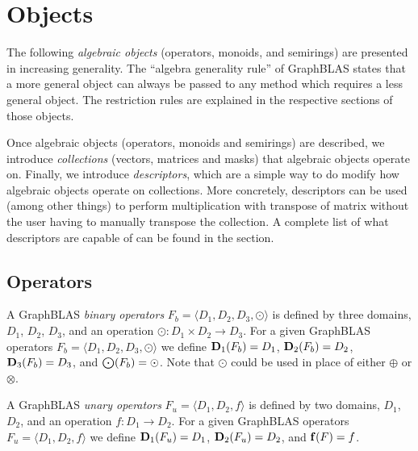 \chapter{Objects}
\label{Chp:Objects}

The following \emph{algebraic objects} (operators, monoids, and semirings) are presented in increasing generality.
The ``algebra generality rule'' of GraphBLAS states that a more general object can always be passed to
any method which requires a less general object. The restriction rules are explained in the respective sections of those objects.

Once algebraic objects (operators, monoids and semirings) are described, we introduce \emph{collections} (vectors, matrices and masks) that algebraic objects operate on. Finally, we introduce \emph{descriptors}, which are a simple way to do modify how algebraic objects operate on collections. More concretely, descriptors can be used (among other things) to perform multiplication with transpose of matrix without the user having to manually transpose the collection. A complete list of what descriptors are capable of can be found in the section.

\section{Operators}

A GraphBLAS \emph{binary operators} $F_b = \langle D_1, D_2, D_3, \odot \rangle$
is defined by three domains, $D_1$, $D_2$, $D_3$, and an operation
$\odot: D_1 \times D_2 \rightarrow D_3$.  For a given GraphBLAS operators
$F_b=\langle D_1, D_2, D_3,\odot \rangle$ we define $\bold{D}_1(F_b) = D_1$,
$\bold{D}_2(F_b) = D_2$, $\bold{D}_3(F_b) = D_3$, and $\bold{\bigodot}(F_b)
= \odot$.  Note that $\odot$ could be used in place of either $\oplus$ or $\otimes$.

A GraphBLAS \emph{unary operators} $F_u = \langle D_1, D_2, f\rangle$
is defined by two domains, $D_1$, $D_2$, and an operation
$f: D_1 \rightarrow D_2$.  For a given GraphBLAS operators
$F_u=\langle D_1, D_2, f \rangle$ we define $\bold{D}_1(F_u) = D_1$,
$\bold{D}_2(F_u) = D_2$, and $\bold{f}(F)
= f$.

